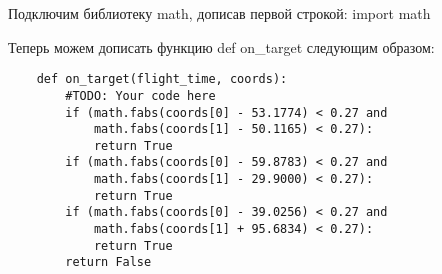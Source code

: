Подключим библиотеку math, дописав первой строкой: import math

Теперь можем дописать функцию def on\_target следующим образом:
\begin{verbatim}
    def on_target(flight_time, coords):
        #TODO: Your code here
        if (math.fabs(coords[0] - 53.1774) < 0.27 and 
            math.fabs(coords[1] - 50.1165) < 0.27):
            return True
        if (math.fabs(coords[0] - 59.8783) < 0.27 and 
            math.fabs(coords[1] - 29.9000) < 0.27):
            return True
        if (math.fabs(coords[0] - 39.0256) < 0.27 and 
            math.fabs(coords[1] + 95.6834) < 0.27):
            return True
        return False

\end{verbatim}